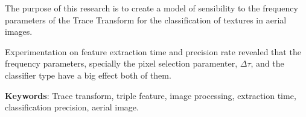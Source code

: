 The purpose of this research is to create a model of sensibility to the frequency parameters of the Trace Transform for the classification of textures in aerial images.

Experimentation on feature extraction time and precision rate revealed that the frequency parameters, specially the pixel selection paramenter, $\Delta \tau$, and the classifier type have a big effect both of them.


\textbf{Keywords}: Trace transform, triple feature, image processing, extraction time, classification precision, aerial image.
\vspace*{\fill}



\singlespace